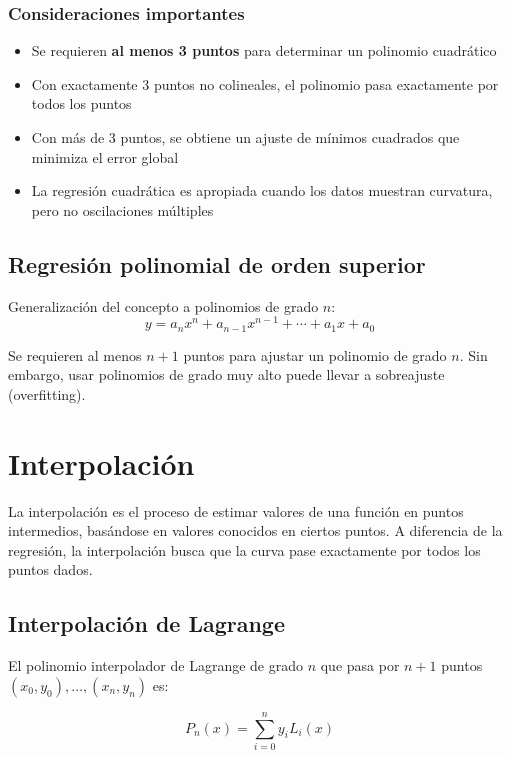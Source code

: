 \documentclass[12pt,a4paper]{article}
\begin{document}
\subsubsection{Consideraciones importantes}

\begin{itemize}
    \item Se requieren \textbf{al menos 3 puntos} para determinar un polinomio cuadrático
    \item Con exactamente 3 puntos no colineales, el polinomio pasa exactamente por todos los puntos
    \item Con más de 3 puntos, se obtiene un ajuste de mínimos cuadrados que minimiza el error global
    \item La regresión cuadrática es apropiada cuando los datos muestran curvatura, pero no oscilaciones múltiples
\end{itemize}

\subsection{Regresión polinomial de orden superior}

Generalización del concepto a polinomios de grado $n$:
\begin{equation}
    y = a_n x^n + a_{n-1} x^{n-1} + \cdots + a_1 x + a_0
\end{equation}

Se requieren al menos $n+1$ puntos para ajustar un polinomio de grado $n$. Sin embargo, usar polinomios de grado muy alto puede llevar a sobreajuste (overfitting).

\section{Interpolación}

La interpolación es el proceso de estimar valores de una función en puntos intermedios, basándose en valores conocidos en ciertos puntos. A diferencia de la regresión, la interpolación busca que la curva pase exactamente por todos los puntos dados.

\subsection{Interpolación de Lagrange}

El polinomio interpolador de Lagrange de grado $n$ que pasa por $n+1$ puntos $(x_0, y_0), \ldots, (x_n, y_n)$ es:

\begin{equation}
    P_n(x) = \sum_{i=0}^{n} y_i L_i(x)
\end{equation}
\end{document}
